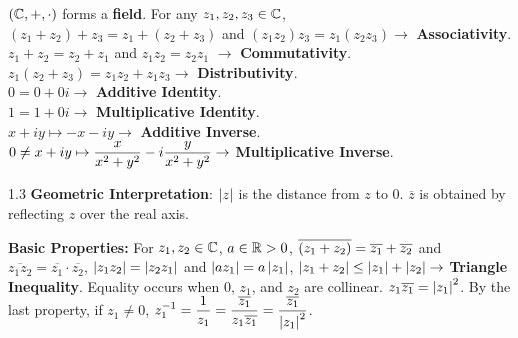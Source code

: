 \documentclass{article}
\newcommand{\framethis}[2][1.3]{
  \begin{framed}
    \begin{spacing}{#1}
      #2
    \end{spacing}
  \end{framed}
}
\begin{document}
  \begin{framed}\begin{spacing}{1.4}
    $\left({\mathbb C}, +, \cdot\right)$ forms a \textbf{field}. For any $z_1, z_2, z_3
    \in {\mathbb C}$, \\
    $(z_1+z_2)+z_3 = z_1+(z_2+z_3)$ and $(z_1z_2)z_3 = z_1(z_2z_3) \rightarrow$ \textbf{Associativity}. \\
    $z_1+z_2 = z_2+z_1$ and $z_1z_2 = z_2z_1$ $\rightarrow$ \textbf{Commutativity}. \\
    $z_1(z_2+z_3) = z_1z_2 + z_1z_3 \rightarrow$ \textbf{Distributivity}. \\
    $0 = 0 + 0i \rightarrow$ \textbf{Additive Identity}. \\
    $1 = 1 + 0i \rightarrow$ \textbf{Multiplicative Identity}. \\
    $x+iy \mapsto -x-iy \rightarrow$ \textbf{Additive Inverse}. \\
    $\displaystyle 0 \neq x+iy \mapsto \frac{x}{x^2+y^2} -i\frac{y}{x^2+y^2} \rightarrow$ \textbf{Multiplicative Inverse}.
  \end{spacing}
  \end{framed}


  
  \framethis{\textbf{Geometric Interpretation}: $\left|z\right|$ is the distance from 
  $z$ to 0. $\overline{z}$ is obtained by reflecting $z$ over the real axis.}

  \framethis[]{\textbf{Basic Properties:} For $z_1,z_2 \in {\mathbb C}$, $a \in {\mathbb R} > 0$,\el
  $\displaystyle \overline{(z_1+z_2)} = \overline{z_1}+\overline{z_2}$ and $\overline{z_1z_2} = \overline{z_1} \cdot \overline{z_2}$,\el
  $\left|z_1z_2\right| = \left|z_2z_1\right|$ and $\left|az_1\right| = a\left|z_1\right|$,\el
  $\left|z_1+z_2\right| \leq \left|z_1\right|+\left|z_2\right| \rightarrow$ \textbf{Triangle Inequality}. Equality occurs when $0$, $z_1$, and $z_2$ are collinear.\el
  $z_1\overline{z_1} = \left|z_1\right|^2$.\el
  By the last property, if $z_1 \neq 0$, $\displaystyle z_1^{-1} = \frac{1}{z_1} = \frac{\overline{z_1}}{z_1\overline{z_1}} = \frac{\overline{z_1}}{\left|z_1\right|^2}$.}

\end{document}
